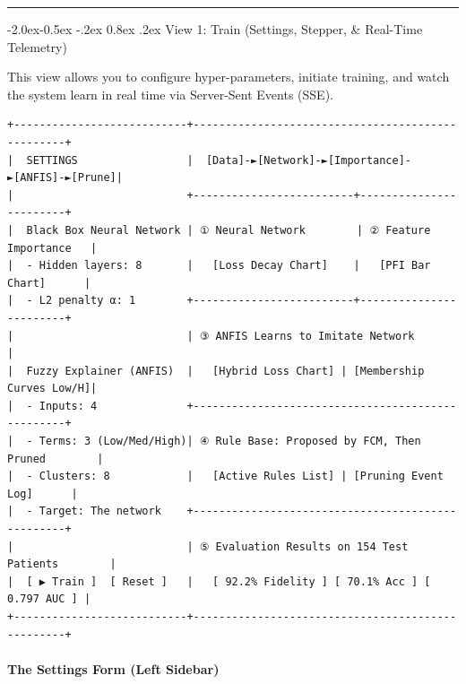 \documentclass[10pt,a4paper]{article}
\makeatletter
\renewcommand\subsubsection{\@startsection{subsubsection}{3}{\z@}%
                                     {-2.0ex\@plus -0.5ex \@minus -.2ex}%
                                     {0.8ex \@plus .2ex}%
                                     {\normalfont\normalsize\bfseries\color{accent}}}
\makeatother
\begin{document}
\begin{center}\rule{0.5\linewidth}{0.5pt}\end{center}

\subsubsection{View 1: Train (Settings, Stepper, \& Real-Time
Telemetry)}\label{view-1-train-settings-stepper-real-time-telemetry}

This view allows you to configure hyper-parameters, initiate training,
and watch the system learn in real time via Server-Sent Events (SSE).

\begin{verbatim}
+---------------------------+--------------------------------------------------+
|  SETTINGS                 |  [Data]-►[Network]-►[Importance]-►[ANFIS]-►[Prune]|
|                           +-------------------------+------------------------+
|  Black Box Neural Network | ① Neural Network        | ② Feature Importance   |
|  - Hidden layers: 8       |   [Loss Decay Chart]    |   [PFI Bar Chart]      |
|  - L2 penalty α: 1        +-------------------------+------------------------+
|                           | ③ ANFIS Learns to Imitate Network                |
|  Fuzzy Explainer (ANFIS)  |   [Hybrid Loss Chart] | [Membership Curves Low/H]|
|  - Inputs: 4              +--------------------------------------------------+
|  - Terms: 3 (Low/Med/High)| ④ Rule Base: Proposed by FCM, Then Pruned        |
|  - Clusters: 8            |   [Active Rules List] | [Pruning Event Log]      |
|  - Target: The network    +--------------------------------------------------+
|                           | ⑤ Evaluation Results on 154 Test Patients        |
|  [ ▶ Train ]  [ Reset ]   |   [ 92.2% Fidelity ] [ 70.1% Acc ] [ 0.797 AUC ] |
+---------------------------+--------------------------------------------------+
\end{verbatim}

\paragraph{The Settings Form (Left
Sidebar)}\label{the-settings-form-left-sidebar}
\end{document}
